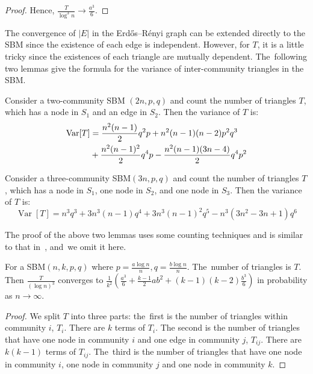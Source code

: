 \documentclass[entropy,article,accept,moreauthors,pdftex]{Definitions/mdpi}
\newcommand{\1}{\mathbbm{1}}
\DeclareMathOperator{\Var}{Var}
\begin{document}
\begin{paracol}{2}
\begin{proof}
	Hence, $\frac{T}{\log^3 n} \to \frac{a^3}{6}$.
\end{proof}
The convergence of $|E|$ in the Erdős–Rényi %
graph can be extended directly to the SBM since the existence of each edge is independent.
However, for $T$, it is a little tricky since the existences of each triangle are mutually dependent. The~following two lemmas
give the formula for the variance of inter-community triangles in the SBM.
\begin{Lemma}\label{lem:SBM_tr_counting_cross}
	Consider a two-community SBM $(2n, p, q)$ and count the number of triangles $T$, which has a node in $S_1$ and an edge in $S_2$.
Then the variance of $T$ is:
\begin{align}
\Var[T] & = \frac{n^2(n-1)}{2}q^2p + n^2(n-1)(n-2)p^2q^3 \notag \\
& + \frac{n^2(n-1)^2}{2}q^4p - \frac{n^2(n-1)(3n-4)}{2}q^4 p^2 \label{eq:SBM_tr_counting_cross}
\end{align}
\end{Lemma}
\begin{Lemma}\label{lem:SBM_tr_counting_3}
	Consider a three-community SBM$(3n, p, q)$ and count the number of triangles $T$, which has a node in $S_1$, one node in $S_2$, and one node in $S_3$.
	Then the variance of $T$ is:
	\begin{equation*}\label{eq:SBM_tr_counting_three}
	\Var[T] = n^3 q^3  + 3n^3(n-1) q^4  + 3 n^3 (n-1)^2 q^5 - n^3(3n^2-3n+1)q^6
	\end{equation*}
\end{Lemma}
The proof of the above two lemmas uses some counting techniques and is similar to that in~\cite{holland1977method}, and~we omit it here.
\begin{Lemma}\label{lem:sbmV}
	For a SBM$(n, k, p, q)$ where $p=\frac{a\log n}{n}, q = \frac{b\log n}{n}$. The~number of triangles is $T$.
	Then $\frac{T}{(\log n)^3}$ converges to $\frac{1}{k^2}(\frac{a^3}{6} + \frac{k-1}{2}ab^2 + (k-1)(k-2)\frac{b^3}{6} )$ in probability as $n \to \infty$.
\end{Lemma}
\begin{proof}
	We split $T$ into three parts: the~first is the number of triangles within community $i$, $T_i$. There are $k$ terms of $T_i$.
	The second is the number of triangles that have one node in community $i$ and one edge in community $j$, $T_{ij}$. There are $k(k-1)$ terms of $T_{ij}$. The~third is the number of triangles that have one node in community $i$, one node in community $j$ and one node in community $k$.
	

\end{proof}
\end{paracol}
\end{document}
